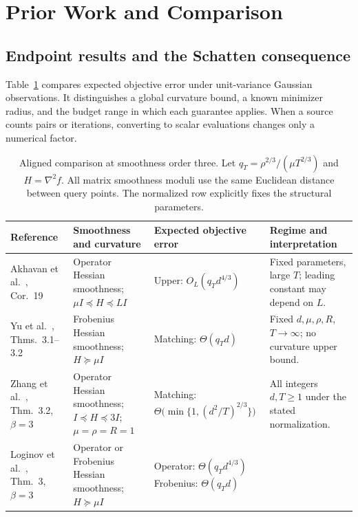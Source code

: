 \documentclass[11pt,a4paper]{article}
\theoremstyle{definition}
\theoremstyle{remark}
\begin{document}
\section{Prior Work and Comparison}
\label{sec:related}
\subsection{Endpoint results and the Schatten consequence}
Table~\ref{tab:comparison} compares expected objective error under unit-variance Gaussian observations. It distinguishes a global curvature bound, a known minimizer radius, and the budget range in which each guarantee applies. When a source counts pairs or iterations, converting to scalar evaluations changes only a numerical factor.

\begin{table}[!htbp]
\centering
\caption{Aligned comparison at smoothness order three. Let $q_T=\rho^{2/3}/(\mu T^{2/3})$ and $H=\nabla^2f$. All matrix smoothness moduli use the same Euclidean distance between query points. The normalized row explicitly fixes the structural parameters.}
\label{tab:comparison}
\small
\renewcommand{\arraystretch}{1.24}
\setlength{\tabcolsep}{4pt}
\begin{tabularx}{\textwidth}{@{}>{\raggedright\arraybackslash}p{}>{\raggedright\arraybackslash}p{}>{\raggedright\arraybackslash}p{}>{\raggedright\arraybackslash}X@{}}
\toprule
Reference & Smoothness and curvature & Expected objective error & Regime and interpretation \\
\midrule
Akhavan et al.~\cite{Akhavan2024}, Cor.~19
& Operator Hessian smoothness; $\mu I\preceq H\preceq LI$
& Upper: $O_L(q_Td^{4/3})$
& Fixed parameters, large $T$; leading constant may depend on $L$. \\
\addlinespace[5pt]
Yu et al.~\cite{Yu2024}, Thms.~3.1--3.2
& Frobenius Hessian smoothness; $H\succeq\mu I$
& Matching: $\Theta(q_Td)$
& Fixed $d,\mu,\rho,R$, $T\to\infty$; no curvature upper bound. \\
\addlinespace[5pt]
Zhang et al.~\cite{Zhang2026}, Thm.~3.2, $\beta=3$
& Operator Hessian smoothness; $I\preceq H\preceq3I$; $\mu=\rho=R=1$
& Matching:\newline $\Theta\!\bigl(\min\{1,(d^2/T)^{2/3}\}\bigr)$
& All integers $d,T\ge1$ under the stated normalization. \\
\addlinespace[5pt]
Loginov et al.~\cite{Loginov2026}, Thm.~3, $\beta=3$
& Operator or Frobenius Hessian smoothness; $H\succeq\mu I$
& Operator: $\Theta(q_Td^{4/3})$\newline Frobenius: $\Theta(q_Td)$

\end{tabularx}
\end{table}
\end{document}
